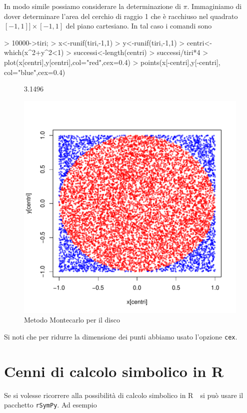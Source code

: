 \documentclass[onecolumn,11pt]{book}
\newcommand{\rpr}{\textsf{R}~}
\begin{document}
In modo simile possiamo considerare la determinazione di $\pi$. Immaginiamo di dover determinare l'area del cerchio di raggio 1 che \`e racchiuso nel quadrato $[-1,1]]\times[-1,1]$ del piano cartesiano.
In tal caso i comandi sono
\begin{Schunk}
\begin{Sinput}
> 10000->tiri;
> x<-runif(tiri,-1,1)
> y<-runif(tiri,-1,1)
> centri<-which(x^2+y^2<1)
> successi<-length(centri)
> successi/tiri*4
> plot(x[centri],y[centri],col="red",cex=0.4)
> points(x[-centri],y[-centri], col="blue",cex=0.4)
\end{Sinput}
\end{Schunk}

\begin{figure}[htbp]
\begin{center}
\begin{Schunk}
\begin{Soutput}
[1] 3.1496
\end{Soutput}
\end{Schunk}
\includegraphics{Rmatematica-161}
\caption{Metodo Montecarlo per il disco}
\label{fig:montecarlo}
\end{center}
\end{figure}
 Si noti che per ridurre la dimensione dei punti abbiamo usato l'opzione \texttt{cex}.
\section{Cenni di calcolo simbolico in \rpr}
Se si volesse ricorrere alla possibilit\`a di calcolo simbolico in \rpr\ si pu\`o usare il pacchetto \texttt{rSymPy}. Ad esempio
\end{document}
